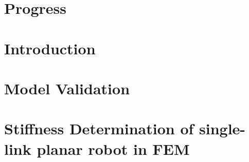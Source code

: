 \documentclass[12pt,twoside]{report}
\begin{document}

\thispagestyle{empty}



%

\tableofcontents

%






\chapter{Progress}


\chapter{Introduction}


\chapter{Model Validation}


\chapter{Stiffness Determination of single-link planar robot in FEM}




%




\newpage


\end{document}
